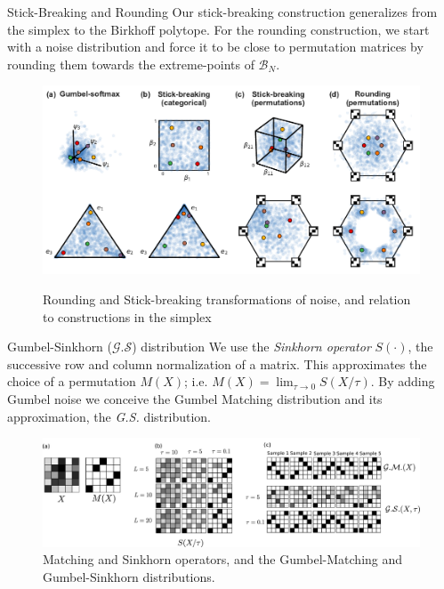 \documentclass[final]{beamer}
\begin{document}
\begin{frame}[allowframebreaks]
\begin{minipage}[htp][1\textheight][t]{\textwidth}
\begin{columns}[t]
\begin{column}{.5\linewidth}
	              
	  
	    \begin{block}{Stick-Breaking and Rounding}
	    \large
	    Our stick-breaking construction generalizes from the simplex \cite{linderman2015dependent} to
the Birkhoff polytope. For the
rounding construction, we start with a noise distribution and force it
to be close to permutation matrices by rounding them towards the
extreme-points of $\mathcal{B}_N$.
           	 \begin{figure}
	    	\centering
		{\includegraphics[width=1.0\textwidth]{figs/Figure1.pdf}}
		 \caption{\normalsize Rounding and Stick-breaking transformations of noise, and relation to constructions in the simplex }
\label{fig:transforms}
	\end{figure}


	  
\end{block}
	
	     
	\begin{block}{Gumbel-Sinkhorn ($\mathcal{G.S}$) distribution}
	\large
We use the \emph{Sinkhorn operator} $S(\cdot)$, the successive row and
column normalization of a matrix. This approximates the choice of a permutation $M(X)$; i.e. $M(X)=\lim_{\tau\rightarrow 0} S(X/\tau)$. By adding Gumbel noise we conceive the Gumbel Matching distribution and its approximation, the  \emph{G.S.} distribution.
			\begin{figure}
         \includegraphics[trim = 0cm 0cm 0mm 0.0cm, clip=true, width=1.0\textwidth]{figs/Figure2.pdf}
	 \caption{\normalsize Matching and Sinkhorn operators, and the Gumbel-Matching and Gumbel-Sinkhorn distributions.}
 \label{fig:figure2}
 \end{figure} 
            \end{block}	
             


\end{column}
\end{columns}
\end{minipage}
\end{frame}
\end{document}
